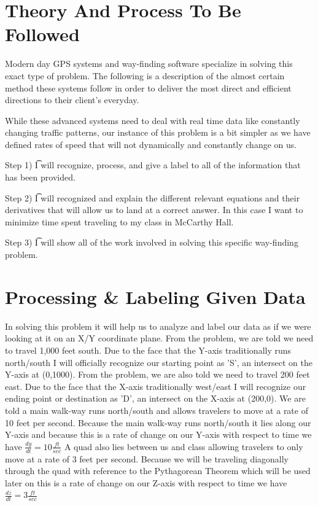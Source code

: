\documentclass{article}
\begin{document}
\section{Theory And Process To Be Followed}

Modern day GPS systems and way-finding software specialize in solving this exact type of problem. The following is a description of the almost certain method these systems follow in order to deliver the most direct and efficient directions to their client's everyday.

While these advanced systems need to deal with real time data like constantly changing traffic patterns, our instance of this problem is a bit simpler as we have defined rates of speed that will not dynamically and constantly change on us.

Step 1) \t I will recognize, process, and give a label to all of the information that has been provided.

Step 2) \t I will recognized and explain the different relevant equations and their derivatives that will allow us to land at a correct answer. In this case I want to minimize time spent traveling to my class in McCarthy Hall.

Step 3) \t I will show all of the work involved in solving this specific way-finding problem.

\section{Processing \& Labeling Given Data}

In solving this problem it will help us to analyze and label our data as if we were looking at it on an X/Y coordinate plane.
From the problem, we are told we need to travel 1,000 feet south. Due to the face that the Y-axis traditionally runs north/south I will officially recognize our starting point as 'S', an intersect on the Y-axis at (0,1000).
From the problem, we are also told we need to travel 200 feet east. Due to the face that the X-axis traditionally west/east I will recognize our ending point or destination as 'D', an intersect on the X-axis at (200,0). 
We are told a main walk-way runs north/south and allows travelers to move at a rate of 10 feet per second. Because the main walk-way runs north/south it lies along our Y-axis and because this is a rate of change on our Y-axis with respect to time we have $ \frac{dy}{dt} = 10\frac{ft}{sec} $ 
A quad also lies between us and class allowing travelers to only move at a rate of 3 feet per second. Because we will be traveling diagonally through the quad with reference to the Pythagorean Theorem which will be used later on this is a rate of change on our Z-axis with respect to time we have $ \frac{dz}{dt} = 3\frac{ft}{sec} $ 
\end{document}
